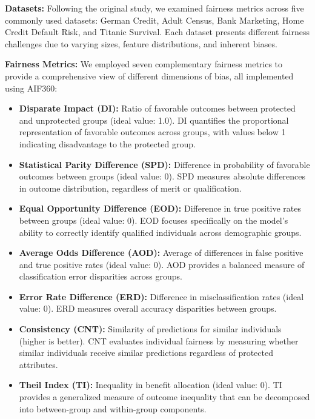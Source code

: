 \documentclass[10pt,journal,compsoc]{IEEEtran}
\begin{document}
\textbf{Datasets:} Following the original study, we examined fairness metrics across five commonly used datasets: German Credit, Adult Census, Bank Marketing, Home Credit Default Risk, and Titanic Survival. Each dataset presents different fairness challenges due to varying sizes, feature distributions, and inherent biases.

\textbf{Fairness Metrics:} We employed seven complementary fairness metrics to provide a comprehensive view of different dimensions of bias, all implemented using AIF360\cite{12}:

\begin{itemize}
\item \textbf{Disparate Impact (DI):} Ratio of favorable outcomes between protected and unprotected groups (ideal value: 1.0). DI quantifies the proportional representation of favorable outcomes across groups, with values below 1 indicating disadvantage to the protected group.

\item \textbf{Statistical Parity Difference (SPD):} Difference in probability of favorable outcomes between groups (ideal value: 0). SPD measures absolute differences in outcome distribution, regardless of merit or qualification.

\item \textbf{Equal Opportunity Difference (EOD):} Difference in true positive rates between groups (ideal value: 0). EOD focuses specifically on the model's ability to correctly identify qualified individuals across demographic groups.

\item \textbf{Average Odds Difference (AOD):} Average of differences in false positive and true positive rates (ideal value: 0). AOD provides a balanced measure of classification error disparities across groups.

\item \textbf{Error Rate Difference (ERD):} Difference in misclassification rates (ideal value: 0). ERD measures overall accuracy disparities between groups.

\item \textbf{Consistency (CNT):} Similarity of predictions for similar individuals (higher is better). CNT evaluates individual fairness by measuring whether similar individuals receive similar predictions regardless of protected attributes.

\item \textbf{Theil Index (TI):} Inequality in benefit allocation (ideal value: 0). TI provides a generalized measure of outcome inequality that can be decomposed into between-group and within-group components.
\end{itemize}
\end{document}

